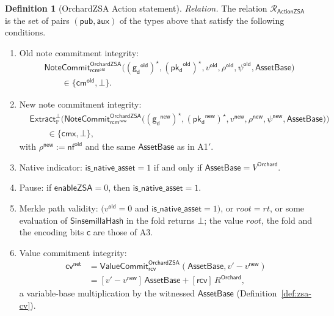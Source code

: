 \documentclass[11pt,a4paper]{article}
\theoremstyle{definition}
\newtheorem{definition}[theorem]{Definition}
\newcommand{\PP}{\mathbb{P}}
\newcommand{\Rel}{\mathcal{R}}
\newcommand{\nfsym}{\mathsf{nf}}
\newcommand{\cmsym}{\mathsf{cm}}
\newcommand{\cmx}{\mathsf{cmx}}
\newcommand{\cvsym}{\mathsf{cv}}
\newcommand{\NoteCommit}{\ensuremath{\mathsf{NoteCommit}}}
\newcommand{\Extract}{\ensuremath{\mathsf{Extract}}}
\newcommand{\pkd}{\ensuremath{\mathsf{pk_d}}}
\newcommand{\gd}{\ensuremath{\mathsf{g_d}}}
\newcommand{\rcv}{\ensuremath{\mathsf{rcv}}}
\newcommand{\rcm}{\ensuremath{\mathsf{rcm}}}
\begin{document}
\begin{definition}[OrchardZSA Action statement]
\emph{Relation.} The relation $\Rel_{\mathsf{ActionZSA}}$ is the set of
pairs $(\mathsf{pub}, \mathsf{aux})$ of the types above that satisfy the
following conditions.
\begin{enumerate}[leftmargin=3.6em]
\item[A1$'$.] Old note commitment integrity:
  \begin{align*}
    &\NoteCommit^{\mathsf{OrchardZSA}}_{\rcm^{\mathsf{old}}}\bigl(
      (\gd^{\mathsf{old}})^{\star}, (\pkd^{\mathsf{old}})^{\star},
      v^{\mathsf{old}}, \rho^{\mathsf{old}}, \psi^{\mathsf{old}},
      \mathsf{AssetBase}\bigr) \\
    &\qquad \in \{\cmsym^{\mathsf{old}}, \bot\}.
  \end{align*}
\item[A2$'$.] New note commitment integrity:
  \begin{align*}
    &\Extract_{\PP}^{\bot}\bigl(\NoteCommit^{\mathsf{OrchardZSA}}_{
      \rcm^{\mathsf{new}}}\bigl((\gd^{\mathsf{new}})^{\star},
      (\pkd^{\mathsf{new}})^{\star}, v^{\mathsf{new}}, \rho^{\mathsf{new}},
      \psi^{\mathsf{new}}, \mathsf{AssetBase}\bigr)\bigr) \\
    &\qquad \in \{\cmx, \bot\},
  \end{align*}
  with $\rho^{\mathsf{new}} := \nfsym^{\mathsf{old}}$ and the same
  $\mathsf{AssetBase}$ as in A1$'$.
\item[C1.] Native indicator: $\mathsf{is\_native\_asset} = 1$ if and only
  if $\mathsf{AssetBase} = V^{\mathsf{Orchard}}$.
\item[C2.] Pause: if $\mathsf{enableZSA} = 0$, then
  $\mathsf{is\_native\_asset} = 1$.
\item[A3$'$.] Merkle path validity: $(v^{\mathsf{old}} = 0$ and
  $\mathsf{is\_native\_asset} = 1)$, or $\mathit{root} = \mathit{rt}$, or
  some evaluation of $\mathsf{SinsemillaHash}$ in the fold returns $\bot$;
  the value $\mathit{root}$, the fold and the encoding bits $\mathsf{c}$
  are those of A3.
\item[A4$'$.] Value commitment integrity:
  \begin{align*}
    \cvsym^{\mathsf{net}}
    &= \mathsf{ValueCommit}^{\mathsf{OrchardZSA}}_{\rcv}(\mathsf{AssetBase},
      v' - v^{\mathsf{new}}) \\
    &= [v' - v^{\mathsf{new}}]\,\mathsf{AssetBase}
      + [\rcv]\,R^{\mathsf{Orchard}},
  \end{align*}
  a variable-base multiplication by the witnessed $\mathsf{AssetBase}$
  (Definition~\ref{def:zsa-cv}).

\end{enumerate}
\end{definition}
\end{document}
